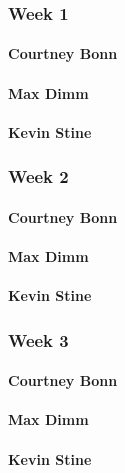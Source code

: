 \documentclass[letterpaper,10pt,draftclsnofoot,onecolumn,titlepage]{IEEEtran}
\begin{document}
		\subsubsection{Week 1}
		
			\paragraph{Courtney Bonn}

			\paragraph{Max Dimm}
			
			\paragraph{Kevin Stine}
			
		\subsubsection{Week 2}
		
			\paragraph{Courtney Bonn}

			\paragraph{Max Dimm}
			
			\paragraph{Kevin Stine}
		
		\subsubsection{Week 3}
		
			\paragraph{Courtney Bonn}

			\paragraph{Max Dimm}
			
			\paragraph{Kevin Stine}
			
\end{document}
